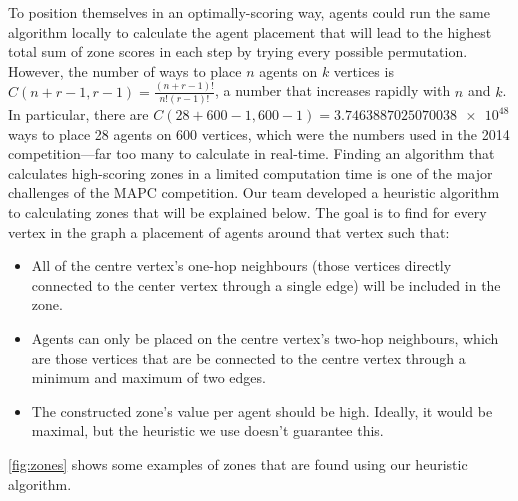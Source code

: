 To position themselves in an optimally-scoring way, agents could run the same algorithm locally to calculate the agent placement that will lead to the highest total sum of zone scores in each step by trying every possible permutation.
However, the number of ways to place $n$ agents on $k$ vertices is $C \left (n+r-1,r-1\right )= \frac{\left(n+r-1 \right )!}{n!\left(r-1 \right )!}$, a number that increases rapidly with $n$ and $k$.
In particular, there are $C \left (28+600-1,600-1 \right ) =\num{3.7463887025070038e+48}$ ways to place 28 agents on 600 vertices, which were the numbers used in the 2014 competition---far too many to calculate in real-time.
Finding an algorithm that calculates high-scoring zones in a limited computation time is one of the major challenges of the MAPC competition.
Our team developed a heuristic algorithm to calculating zones that will be explained below.
The goal is to find for every vertex in the graph a placement of agents around that vertex such that:
\begin{itemize}
  \item All of the centre vertex's one-hop neighbours (those vertices directly connected to the center vertex through a single edge) will be included in the zone.
  \item Agents can only be placed on the centre vertex's two-hop neighbours, which are those vertices that are be connected to the centre vertex through a minimum and maximum of two edges.
  \item The constructed zone's value per agent should be high.
        Ideally, it would be maximal, but the heuristic we use doesn't guarantee this.
\end{itemize}
\autoref{fig:zones} shows some examples of zones that are found using our heuristic algorithm.
